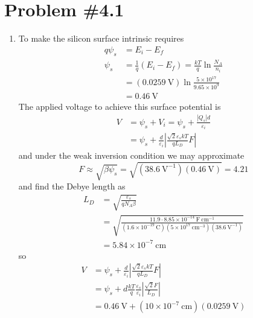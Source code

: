 \documentclass{article}
\begin{document}
\section*{Problem \#4.1}
\begin{enumerate}
  \item{To make the silicon surface intrinsic requires 
        \begin{align*}
        q\psi_s &= E_i - E_f \\
        \psi_s &= \frac{1}{q}(E_i - E_f) = \frac{kT}{q} \ln \frac{N_A}{n_i} \\
               &= (0.0259 ~\mathrm{V}) \ln \frac{5 \times 10^{17}}{9.65 \times 10^9} \\
               &= 0.46 ~\mathrm{V}
        \end{align*}
        The applied voltage to achieve this surface potential is  
        \begin{align*}
        V &= \psi_s + V_i = \psi_s + \frac{|Q_s|d}{\varepsilon_i} \\
          &= \psi_s + \frac{d}{\varepsilon_i}
                      \left|\frac{\sqrt{2}\varepsilon_s kT}{q L_D} 
                            F\right|
        \end{align*}
        and under the weak inversion condition we may approximate 
        $$
        F \approx \sqrt{\beta \psi_s} 
          = \sqrt{(38.6 ~\mathrm{V}^{-1})(0.46 ~\mathrm{V})} = 4.21
        $$
        and find the Debye length as
        \begin{align*}
        L_D &= \sqrt{\frac{\varepsilon_s}{q N_A \beta}} \\
            &= \sqrt{\frac{11.9 \cdot 8.85 \times 10^{-14} ~\mathrm{F}~\mathrm{cm}^{-1}}
                         {(1.6 \times 10^{-19} ~\mathrm{C})
                          (5 \times 10^{17} ~\mathrm{cm}^{-3})
                          (38.6 ~\mathrm{V}^{-1})}} \\
            &= 5.84 \times 10^{-7} ~\mathrm{cm}
        \end{align*}
         so
        \begin{align*}
        V &= \psi_s + \frac{d}{\varepsilon_i}
                      \left|\frac{\sqrt{2}\varepsilon_s kT}{q L_D} 
                            F\right| \\
          &= \psi_s + d\frac{kT}{q} \frac{\varepsilon_s}{\varepsilon_i}
                      \left|\frac{\sqrt{2}F}{L_D}\right| \\
          &= 0.46 ~\mathrm{V} + (10 \times 10^{-7} ~\mathrm{cm})
                    (0.0259 ~\mathrm{V})

\end{align*}}
\end{enumerate}
\end{document}

